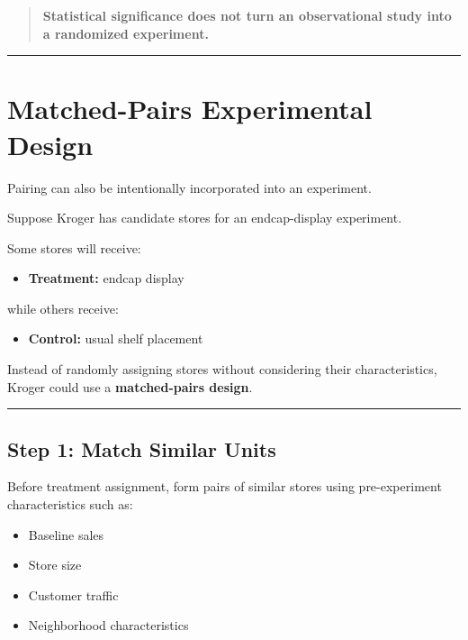 \documentclass[
  letterpaper,
  DIV=11,
  numbers=noendperiod]{scrreprt}
\providecommand{\tightlist}{%
  \setlength{\itemsep}{0pt}\setlength{\parskip}{0pt}}
\begin{document}
\begin{quote}
\textbf{Statistical significance does not turn an observational study
into a randomized experiment.}
\end{quote}

\begin{center}\rule{0.5\linewidth}{0.5pt}\end{center}


\chapter{Matched-Pairs Experimental
Design}\label{matched-pairs-experimental-design}

Pairing can also be intentionally incorporated into an experiment.

Suppose Kroger has candidate stores for an endcap-display experiment.

Some stores will receive:

\begin{itemize}
\tightlist
\item
  \textbf{Treatment:} endcap display
\end{itemize}

while others receive:

\begin{itemize}
\tightlist
\item
  \textbf{Control:} usual shelf placement
\end{itemize}

Instead of randomly assigning stores without considering their
characteristics, Kroger could use a \textbf{matched-pairs design}.

\begin{center}\rule{0.5\linewidth}{0.5pt}\end{center}

\section{Step 1: Match Similar Units}\label{step-1-match-similar-units}

Before treatment assignment, form pairs of similar stores using
pre-experiment characteristics such as:

\begin{itemize}
\tightlist
\item
  Baseline sales
\item
  Store size
\item
  Customer traffic
\item
  Neighborhood characteristics
\end{itemize}
\end{document}
